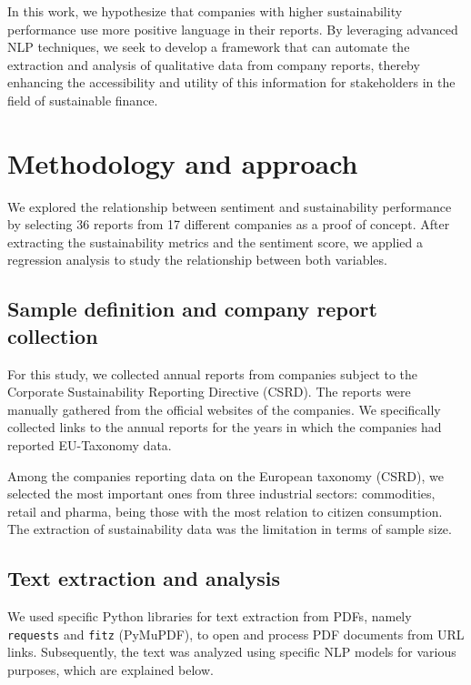 \documentclass[times]{oupau}
\begin{document}
In this work, we hypothesize that companies with higher sustainability performance use more positive language in their reports. By leveraging advanced NLP techniques, we seek to develop a framework that can automate the extraction and analysis of qualitative data from company reports, thereby enhancing the accessibility and utility of this information for stakeholders in the field of sustainable finance.
\par
\justify

\section{Methodology and approach}

We explored the relationship between sentiment and sustainability performance by selecting 36 reports from 17 different companies as a proof of concept. After extracting the sustainability metrics and the sentiment score, we applied a regression analysis to study the relationship between both variables.

\subsection{Sample definition and company report collection}

For this study, we collected annual reports from companies subject to the Corporate Sustainability Reporting Directive (CSRD). The reports were manually gathered from the official websites of the companies. We specifically collected links to the annual reports for the years in which the companies had reported EU-Taxonomy data.
\par
\justify

Among the companies reporting data on the European taxonomy (CSRD), we selected the most important ones from three industrial sectors: commodities, retail and pharma, being those with the most relation to citizen consumption. The extraction of sustainability data was the limitation in terms of sample size.

\subsection{Text extraction and analysis}
We used specific Python libraries for text extraction from PDFs, namely \texttt{requests} and \texttt{fitz} (PyMuPDF), to open and process PDF documents from URL links. Subsequently, the text was analyzed using specific NLP models for various purposes, which are explained below.
\end{document}
